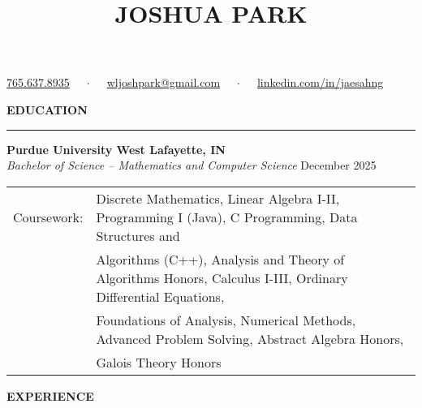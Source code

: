 \documentclass[letter,11pt]{article}
\begin{document}
\title{\Huge{JOSHUA PARK}}
\date{}
\maketitle
\vspace*{-6em}
\begin{center}\begin{small}
  \href{tel:7656378935}{765.637.8935} $\quad\cdot\quad$ \href{mailto:wljoshpark@gmail.com}{wljoshpark@gmail.com} $\quad\cdot\quad$ \href{https://www.linkedin.com/in/jaesahng}{linkedin.com/in/jaesahng}
\end{small}\end{center}

\textbf{EDUCATION}

\vspace*{-1.25em}
\rule{\textwidth}{1.2pt}
\textbf{Purdue University \hfill West Lafayette, IN}\\
\emph{Bachelor of Science -- Mathematics and Computer Science} \hfill December 2025 \\
\begin{tabular}{@{}p{1.83cm}l}
    Coursework: & Discrete Mathematics, Linear Algebra I-II,  Programming I (Java), C Programming, Data Structures and \\
    & Algorithms (C++), Analysis and Theory of Algorithms Honors, Calculus I-III, Ordinary Differential Equations, \\
    & Foundations of Analysis, Numerical Methods, Advanced Problem Solving, Abstract Algebra Honors, \\
    & Galois Theory Honors
\end{tabular}
\vspace*{.5em}

\textbf{EXPERIENCE}
\end{document}
